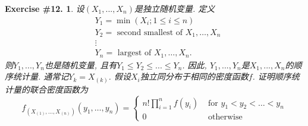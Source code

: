 \documentclass[UTF8, a4paper]{article}
\newtheorem{exercise}{Exercise \#12.}
\begin{document}
\begin{framed}
\begin{exercise}
设\((X_1, ..., X_n)\)是独立随机变量. 定义
$$
\begin{aligned}
& Y_1=\min \left(X_i ; 1 \leq i \leq n\right) \\
& Y_2=\text { second smallest of } X_1, \ldots, X_n \\
& \vdots \\
& Y_n=\text { largest of } X_1, \ldots, X_n.
\end{aligned}
$$
则\(Y_1, ..., Y_n\)也是随机变量, 且有\(Y_1\leq Y_2 \leq ... \leq Y_n \).
因此, \(Y_1, ..., Y_n\)是\(X_1, ..., X_n\)的顺序统计量.
通常记\(Y_k = X_{(k)}\).
假设\(X_i\)独立同分布于相同的密度函数\(f\). 证明顺序统计量的联合密度函数为
$$
f_{\left(X_{(1)}, \ldots, X_{(n)}\right)}\left(y_1, \ldots, y_n\right)= \begin{cases}n!\prod_{i=1}^n f\left(y_i\right) & \text { for } y_1<y_2<\ldots<y_n \\ 0 & \text { otherwise }\end{cases}
$$
\end{exercise}
\end{framed}
\end{document}
